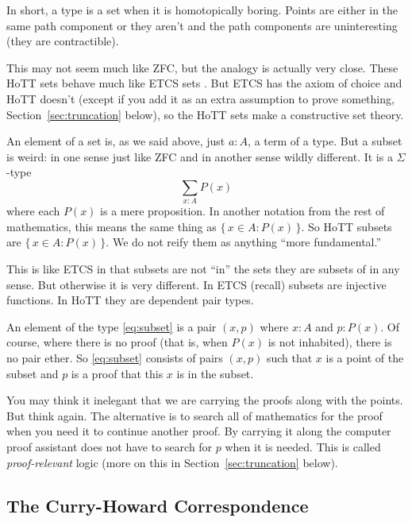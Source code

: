 \documentclass[11pt]{article}
\newcommand{\set}[1]{\{\,#1\,\}}
\begin{document}
In short, a type is a set when it is homotopically boring.  Points
are either in the same path component or they aren't and the path
components are uninteresting (they are contractible).

This may not seem much like ZFC, but the analogy is actually very close.
These HoTT sets behave much like ETCS sets .
But ETCS has the axiom of choice
and HoTT doesn't (except if you add it as an extra assumption to prove
something, Section~\ref{sec:truncation} below),
so the HoTT sets make a constructive set theory.

An element of a set is, as we said above, just $a : A$, a term of a type.
But a subset is weird: in one sense just like ZFC and in
another sense wildly different.  It is a $\Sigma$-type
\begin{equation} \label{eq:subset}
   \sum_{x : A} P(x)
\end{equation}
where each $P(x)$ is a mere proposition.  In another notation from the rest
of mathematics, this means the same thing as $\set{x \in A: P(x)}$.
So HoTT subsets are $\set{x \in A: P(x)}$.  We do not reify them as
anything ``more fundamental.''

This is like ETCS in that subsets are not ``in'' the sets they are subsets
of in any sense.  But otherwise it is very different.  In ETCS (recall)
subsets are injective functions.  In HoTT they are dependent pair types.

An element of the type \eqref{eq:subset} is a pair $(x, p)$
where $x : A$ and $p : P(x)$.  Of course, where there is no proof (that is,
when $P(x)$ is not inhabited), there is no pair ether.
So \eqref{eq:subset} consists of pairs $(x, p)$ such that $x$ is a point
of the subset and $p$ is a proof that this $x$ is in the subset.

You may think it inelegant that we are carrying the proofs along with
the points.  But think again.  The alternative is to search all of mathematics
for the proof when you need it to continue another proof.  By carrying it
along the computer proof assistant does not have to search for $p$ when it
is needed.  This is called \emph{proof-relevant} logic
(more on this in Section~\ref{sec:truncation} below).

\subsection{The Curry-Howard Correspondence}
\label{sec:curry-howard}
\end{document}
